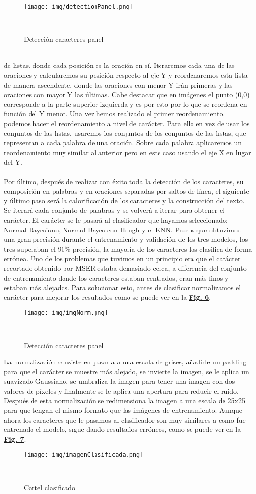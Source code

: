 \documentclass[a4paper, 12pt]{article}
\begin{document}
\begin{figure}[h]
	\centering
	\texttt{[image: img/detectionPanel.png]}
 	\caption{Detección caracteres panel}\
	\label{fig:imagenDetectada}
\end{figure}
\\de listas, donde cada posición es la oración en sí. Iteraremos cada una de las oraciones y calcularemos su posición respecto al eje Y y reordenaremos esta lista de manera ascendente, donde las oraciones con menor Y irán primeras y las oraciones con mayor Y las últimas. Cabe destacar que en imágenes el punto (0,0) corresponde a la parte superior izquierda y es por esto por lo que se reordena en función del Y menor. Una vez hemos realizado el primer reordenamiento, podemos hacer el reordenamiento a nivel de carácter. Para ello en vez de usar los conjuntos de las listas, usaremos los conjuntos de los conjuntos de las listas, que representan a cada palabra de una oración. Sobre cada palabra aplicaremos un reordenamiento muy similar al anterior pero en este caso usando el eje X en lugar del Y. 
\\\\ Por último, después de realizar con éxito toda la detección de los caracteres, su composición en palabras y en oraciones separadas por saltos de línea, el siguiente y último paso será la calorificación de los caracteres y la construcción del texto. Se iterará cada conjunto de palabras y se volverá a iterar para obtener el carácter. El carácter se le pasará al clasificador que hayamos seleccionado: Normal Bayesiano, Normal Bayes con Hough y el KNN. Pese a que obtuvimos una gran precisión durante el entrenamiento y validación de los tres modelos, los tres superaban el 90\% precisión, la mayoría de los caracteres los clasifica de forma errónea. Uno de los problemas que tuvimos en un principio era que el carácter recortado obtenido por MSER estaba demasiado cerca, a diferencia del conjunto de entrenamiento donde los caracteres estaban centrados, eran más finos y estaban más alejados. Para solucionar esto, antes de clasificar normalizamos el carácter para mejorar los resultados como se puede ver en la \textbf{\hyperref[fig:imagenDetectada]{Fig. 6}}.
\newpage
\begin{figure}[h]
	\centering
	\texttt{[image: img/imgNorm.png]}
 	\caption{Detección caracteres panel}\
	\label{fig:imagenDetectada}
\end{figure}
La normalización consiste en pasarla a una escala de grises, añadirle un padding para que el carácter se muestre más alejado, se invierte la imagen, se le aplica un suavizado Gaussiano, se umbraliza la imagen para tener una imagen con dos valores de píxeles y finalmente se le aplica una apertura para reducir el ruido. Después de esta normalización se redimensiona la imagen a una escala de 25x25 para que tengan el mismo formato que las imágenes de entrenamiento. Aunque ahora los caracteres que le pasamos al clasificador son muy similares a como fue entrenado el modelo, sigue dando resultados erróneos, como se puede ver en la \textbf{\hyperref[fig:imagenClasificada]{Fig. 7}}.
\begin{figure}[h]
	\centering
	\texttt{[image: img/imagenClasificada.png]}
 	\caption{Cartel clasificado}\
	\label{fig:imagenClasificada}
\end{figure}
\end{document}

